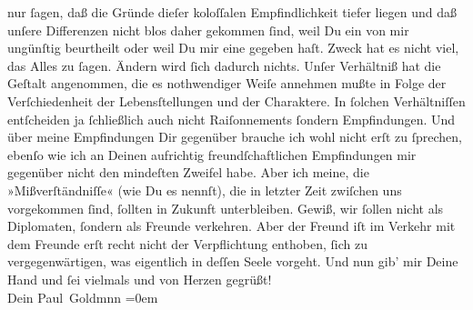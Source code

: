 \begin{ledgroupsized}[t]{13cm}
               nur ſagen, daß die Gründe dieſer koloſſalen Empfindlichkeit tiefer liegen und daß
               unſere Differenzen nicht blos daher gekommen ſind, weil Du ein \label{K_L03194-3v}\label{K_L03194-3h} von mir ungünſtig beurtheilt  oder weil Du mir eine \label{K_L03194-4v}\label{K_L03194-4h} gegeben haſt.\pend
           \pstart
           Zweck hat es nicht viel, das Alles zu ſagen. Ändern wird ſich dadurch nichts. Unſer
               Verhältniß hat die Geſtalt angenommen, {\pb}die es
               nothwendiger Weiſe annehmen mußte in Folge der Verſchiedenheit der Lebensſtellungen
               und der Charaktere. In ſolchen Verhältniſſen entſcheiden ja ſchließlich auch nicht
               Raiſonnements ſondern Empfindungen. Und über meine Empfindungen Dir gegenüber brauche
               ich wohl nicht erſt zu ſprechen, ebenſo wie ich an Deinen aufrichtig\strikeout{\textcolor{gray}{e}} freundſchaftlichen Empfindungen
                   mir gegenüber nicht den mindeſten Zweifel habe.
               Aber ich meine, die »Mißverſtändniſſe« (wie Du es nennſt), die in letzter Zeit
               zwiſchen uns vorgekommen ſind, ſollten in Zukunft unterbleiben. Gewiß, wir ſollen
               nicht als Diplomaten, ſondern als Freunde verkehren. Aber der Freund iſt im Verkehr mit dem Freunde erſt recht nicht der Verpflichtung
               enthoben, ſich zu vergegenwärtigen, was eigentlich in deſſen Seele vorgeht.\pend
           \pstart
           Und nun gib’ mir Deine Hand und ſei  vielmals
               und von Herzen gegrüßt! {\\[\baselineskip]}Dein \spacefill\mbox{Paul Goldmnn}\pend
           \leftskip=0em{}
         

\end{ledgroupsized}
